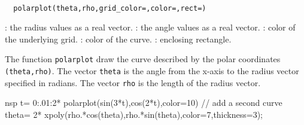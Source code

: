 
\begin{mandesc}
  \\
\end{mandesc}
\begin{calling_sequence}
\begin{verbatim}
  polarplot(theta,rho,grid_color=,color=,rect=)
\end{verbatim}
\end{calling_sequence}

\begin{parameters}
  \begin{varlist}
    : the radius values as a real vector.
    : the angle values as a real vector.
    : color of the underlying grid.
    : color of the curve.
    : enclosing rectangle.
  \end{varlist}
\end{parameters}

\begin{mandescription}
  The function \verb!polarplot! draw the curve described by the polar coordinates \verb!(theta,rho)!.
  The vector \verb!theta! is the angle from the x-axis to the radius vector specified in radians.
  The vector \verb!rho! is the length of the radius vector.
\end{mandescription}

\begin{examples}
  \begin{mintednsp}{nsp}
    t= 0:.01:2*%
    polarplot(sin(3*t),cos(2*t),color=10)
    // add a second curve
    theta= 2*%
    xpoly(rho.*cos(theta),rho.*sin(theta),color=7,thickness=3);
  \end{mintednsp}
\end{examples}
